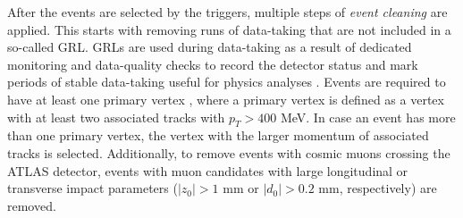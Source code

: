 \begin{table}[htpb!]
\caption{Trigger strategy for the used Run-2 dataset \label{tab:analysis:trigger}}
\end{table}

After the events are selected by the triggers,  multiple steps of \textit{event cleaning} are applied.  This starts with removing runs of data-taking that are not included in a so-called \ac{GRL}.  \acp{GRL} are used during data-taking as a result of dedicated monitoring and data-quality checks to record the detector status and mark periods of stable data-taking useful for physics analyses \cite{DQandGRL}.  
Events are required to have at least one primary vertex \cite{PrimaryVertex},  where a primary vertex is defined as a vertex with at least two associated tracks with $p_T > 400$ MeV.  In case an event has more than one primary vertex,  the vertex with the larger momentum of associated tracks is selected.  Additionally,  to remove events with cosmic muons crossing the \ac{ATLAS} detector,  events with muon candidates with large longitudinal or transverse impact parameters ($|z_0| > 1 $ mm or $ |d_0| > 0.2$  mm,  respectively) are removed.

